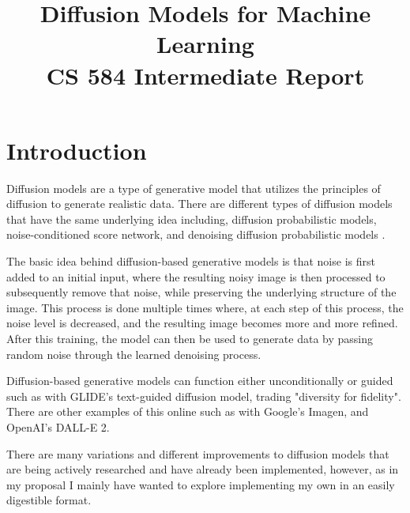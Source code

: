\documentclass[conference]{IEEEtran}
\begin{document}
\title{%
    Diffusion Models for Machine Learning \\
    \huge CS 584 Intermediate Report}

\author{
}

\maketitle


\section{Introduction}

Diffusion models are a type of generative model that utilizes the principles of diffusion to generate realistic data. There are different types of diffusion models
that have the same underlying idea including, diffusion probabilistic models, noise-conditioned score network,
and denoising diffusion probabilistic models \cite{weng2021diffusion}.

The basic idea behind diffusion-based generative models is that noise is first added to an initial input,
where the resulting noisy image is then processed to subsequently remove that noise, while preserving the underlying structure of the image.
This process is done multiple times where, at each step of this process, the noise level is decreased, and the resulting image becomes more and more refined. After this training, the model can then be used to generate data by passing random noise through the learned denoising process.

Diffusion-based generative models can function either unconditionally or guided such as with GLIDE's text-guided diffusion model, trading "diversity for fidelity"\cite{GLIDE}. There are other examples of this online such as with Google's Imagen, and OpenAI's DALL-E 2.

There are many variations\cite{hoCF}\cite{kerasDDPM}\cite{pmlr-v162-nichol22a}\cite{hugimpl} and different improvements\cite{nichol2021improved}\cite{song2022denoising} to diffusion models that are being actively researched and have already been implemented, however, as in my proposal I mainly have wanted to explore implementing my own in an easily digestible format.
\end{document}
